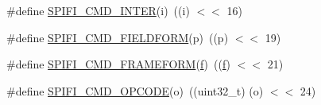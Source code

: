 \begin{DoxyCompactItemize}
\item 
\#define \hyperlink{group___l_p_c_s_p_i_f_i_l_i_b___h_w___p_r_i_m_ga6ba616a9213dff16023f9b5b52c0f07e}{S\+P\+I\+F\+I\+\_\+\+C\+M\+D\+\_\+\+I\+N\+T\+ER}(i)~((i) $<$$<$ 16)
\item 
\#define \hyperlink{group___l_p_c_s_p_i_f_i_l_i_b___h_w___p_r_i_m_ga3fa2803ce803501ed89aeb51a9ff1715}{S\+P\+I\+F\+I\+\_\+\+C\+M\+D\+\_\+\+F\+I\+E\+L\+D\+F\+O\+RM}(p)~((p) $<$$<$ 19)
\item 
\#define \hyperlink{group___l_p_c_s_p_i_f_i_l_i_b___h_w___p_r_i_m_ga588e2c6094c256d799970bdad73cfd6a}{S\+P\+I\+F\+I\+\_\+\+C\+M\+D\+\_\+\+F\+R\+A\+M\+E\+F\+O\+RM}(\hyperlink{unity_8c_af900396d7b72ff2a7002e8befe8cf8f1}{f})~((\hyperlink{unity_8c_af900396d7b72ff2a7002e8befe8cf8f1}{f}) $<$$<$ 21)
\item 
\#define \hyperlink{group___l_p_c_s_p_i_f_i_l_i_b___h_w___p_r_i_m_ga39b31bb8811dbd645fcbc13e3260bdad}{S\+P\+I\+F\+I\+\_\+\+C\+M\+D\+\_\+\+O\+P\+C\+O\+DE}(o)~((uint32\+\_\+t) (o) $<$$<$ 24)
\end{DoxyCompactItemize}
